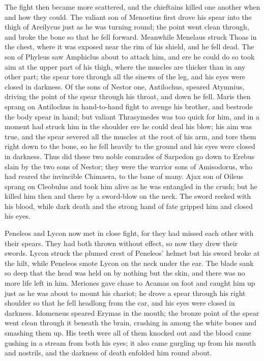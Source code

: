 The fight then became more scattered, and the chieftains killed one
another when and how they could. The valiant son of Menoetius first drove
his spear into the thigh of Areilycus just as he was turning round; the
point went clean through, and broke the bone so that he fell forward.
Meanwhile Menelaus struck Thoas in the chest, where it was exposed near
the rim of his shield, and he fell dead. The son of Phyleus saw Amphiclus
about to attack him, and ere he could do so took aim at the upper part of
his thigh, where the muscles are thicker than in any other part; the spear
tore through all the sinews of the leg, and his eyes were closed in
darkness. Of the sons of Nestor one, Antilochus, speared Atymnius, driving
the point of the spear through his throat, and down he fell. Maris then
sprang on Antilochus in hand-to-hand fight to avenge his brother, and
bestrode the body spear in hand; but valiant Thrasymedes was too quick for
him, and in a moment had struck him in the shoulder ere he could deal his
blow; his aim was true, and the spear severed all the muscles at the root
of his arm, and tore them right down to the bone, so he fell heavily to
the ground and his eyes were closed in darkness. Thus did these two noble
comrades of Sarpedon go down to Erebus slain by the two sons of Nestor;
they were the warrior sons of Amisodorus, who had reared the invincible
Chimaera, to the bane of many. Ajax son of Oileus sprang on Cleobulus and
took him alive as he was entangled in the crush; but he killed him then
and there by a sword-blow on the neck. The sword reeked with his blood,
while dark death and the strong hand of fate gripped him and closed his
eyes.

Peneleos and Lycon now met in close fight, for they had missed each other
with their spears. They had both thrown without effect, so now they drew
their swords. Lycon struck the plumed crest of Peneleos’ helmet but his
sword broke at the hilt, while Peneleos smote Lycon on the neck under the
ear. The blade sank so deep that the head was held on by nothing but the
skin, and there was no more life left in him. Meriones gave chase to
Acamas on foot and caught him up just as he was about to mount his
chariot; he drove a spear through his right shoulder so that he fell
headlong from the car, and his eyes were closed in darkness. Idomeneus
speared Erymas in the mouth; the bronze point of the spear went clean
through it beneath the brain, crashing in among the white bones and
smashing them up. His teeth were all of them knocked out and the blood
came gushing in a stream from both his eyes; it also came gurgling up from
his mouth and nostrils, and the darkness of death enfolded him round
about.

